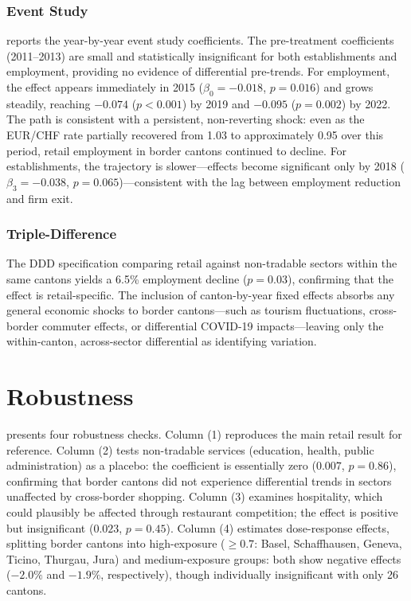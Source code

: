 \documentclass[12pt]{article}
\begin{document}
\subsubsection*{Event Study}  reports the year-by-year event study coefficients. The pre-treatment coefficients (2011--2013) are small and statistically insignificant for both establishments and employment, providing no evidence of differential pre-trends. For employment, the effect appears immediately in 2015 ($\beta_0 = -0.018$, $p = 0.016$) and grows steadily, reaching $-0.074$ ($p < 0.001$) by 2019 and $-0.095$ ($p = 0.002$) by 2022. The path is consistent with a persistent, non-reverting shock: even as the EUR/CHF rate partially recovered from 1.03 to approximately 0.95 over this period, retail employment in border cantons continued to decline. For establishments, the trajectory is slower---effects become significant only by 2018 ($\beta_3 = -0.038$, $p = 0.065$)---consistent with the lag between employment reduction and firm exit.



\subsubsection*{Triple-Difference} The DDD specification comparing retail against non-tradable sectors within the same cantons yields a 6.5\% employment decline ($p = 0.03$), confirming that the effect is retail-specific. The inclusion of canton-by-year fixed effects absorbs any general economic shocks to border cantons---such as tourism fluctuations, cross-border commuter effects, or differential COVID-19 impacts---leaving only the within-canton, across-sector differential as identifying variation.

\section{Robustness}

 presents four robustness checks. Column (1) reproduces the main retail result for reference. Column (2) tests non-tradable services (education, health, public administration) as a placebo: the coefficient is essentially zero ($0.007$, $p = 0.86$), confirming that border cantons did not experience differential trends in sectors unaffected by cross-border shopping. Column (3) examines hospitality, which could plausibly be affected through restaurant competition; the effect is positive but insignificant ($0.023$, $p = 0.45$). Column (4) estimates dose-response effects, splitting border cantons into high-exposure ($\geq 0.7$: Basel, Schaffhausen, Geneva, Ticino, Thurgau, Jura) and medium-exposure groups: both show negative effects ($-2.0\%$ and $-1.9\%$, respectively), though individually insignificant with only 26 cantons.
\end{document}
